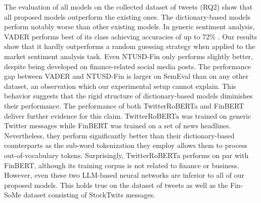 The evaluation of all models on the collected dataset of tweets (RQ2) show that all proposed models outperform the existing ones. The dictionary-based models perform notably worse than other existing models. In generic sentiment analysis, VADER performs best of its class achieving accuracies of up to 72\% . Our results show that it hardly outperforms a random guessing strategy when applied to the market sentiment analysis task. Even NTUSD-Fin only performs slightly better, despite being developed on finance-related social media posts. The performance gap between VADER and NTUSD-Fin is larger on SemEval than on any other dataset, an observation which our experimental setup cannot explain.
 This behavior suggests that the rigid structure of dictionary-based models diminishes their performance. The performance of both TwitterRoBERTa and FinBERT deliver further evidence for this claim. TwitterRoBERTa was trained on generic Twitter messages while FinBERT was trained on a set of news headlines. Nevertheless, they perform significantly better than their dictionary-based counterparts as the sub-word tokenization they employ allows them to process out-of-vocabulary tokens. Surprisingly, TwitterRoBERTa performs on par with FinBERT, although its training corpus is not related to finance or business. However, even these two LLM-based neural networks are inferior to all of our proposed models. This holds true on the dataset of tweets as well as the Fin-SoMe dataset consisting of StockTwits messages.



